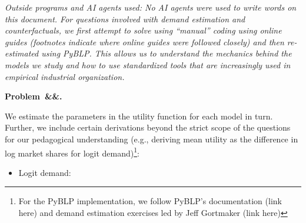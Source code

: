 \documentclass[12pt]{article}
\newcounter{problem}
\newenvironment{problem}[1][]{
    \newpage %
    \refstepcounter{problem}\par\noindent
    \textbf{Problem~\theproblem\ifx&#1&\else.~#1\fi}\rmfamily\par\vspace{0.5em}
}{\vspace{1em}}
\begin{document}
\fancyhf{} %
\vspace{1em}

\emph{Outside programs and AI agents used: No AI agents were used to write words on this document. For questions involved with demand estimation and counterfactuals, we first attempt to solve using ``manual'' coding using online guides (footnotes indicate where online guides were followed closely) and then re-estimated using PyBLP. This allows us to understand the mechanics behind the models we study and how to use standardized tools that are increasingly used in empirical industrial organization.} 

\begin{problem} 
We estimate the parameters in the utility function for each model in turn. Further, we include certain derivations beyond the strict scope of the questions for our pedagogical understanding (e.g., deriving mean utility as the difference in log market shares for logit demand)\footnote{For the PyBLP implementation, we follow PyBLP's documentation (link here) and demand estimation exercises led by Jeff Gortmaker (link here)}:
\begin{itemize}
    \item Logit demand: 
\end{itemize}
\end{problem}
\end{document}
